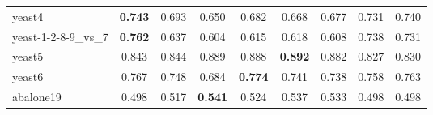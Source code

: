 \begin{table}[htbp]
{\begin{tabular}{lcccccccc}
			yeast4 & \textbf{0.743} & 0.693 & 0.650 & 0.682 & 0.668 & 0.677 & 0.731 & 0.740 \\
			yeast-1-2-8-9\_vs\_7 & \textbf{0.762} & 0.637 & 0.604 & 0.615 & 0.618 & 0.608 & 0.738 & 0.731 \\
			yeast5 & 0.843 & 0.844 & 0.889 & 0.888 & \textbf{0.892} & 0.882 & 0.827 & 0.830 \\
			yeast6 & 0.767 & 0.748 & 0.684 & \textbf{0.774} & 0.741 & 0.738 & 0.758 & 0.763 \\
			abalone19 & 0.498 & 0.517 & \textbf{0.541} & 0.524 & 0.537 & 0.533 & 0.498 & 0.498 \\
			\bottomrule
		\end{tabular}%
		
	}
	\label{tab:F1AllDatasets}%
\end{table}%


